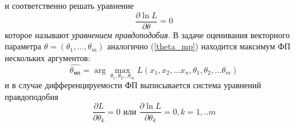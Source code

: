 \documentclass[12pt,a4paper]{scrartcl}
\begin{document}
    и соответственно решать уравнение
    \begin{equation}
         \frac{\partial \ln L}{\partial \theta}= 0
         \label{log_m=0}
    \end{equation}
    которое называют \textit{уравнением правдоподобия}.
    В задаче оценивания векторного параметра $\theta = (\theta_{1}, ... ,\theta_{m})$ аналогично (\ref{theta_mp}) находится максимум ФП нескольких аргументов: 
    \begin{equation}
        \hat{\theta_{мп}} = \arg \max_{\theta_{1}, \theta_{2}...\theta_{m}} L(x_{1}, x_{2},...x_{n}, \theta_{1}, \theta_{2},...\theta_{m})
        \label{multi_theta}
    \end{equation}
    и в случае дифференцируемости ФП выписывается система уравнений правдоподобия
    \begin{equation}
        \frac{\partial L}{\partial \theta_{k}} = 0 \text{  или  } \frac{\partial \ln L}{\partial \theta_{k}} = 0, k = 1,..m
    \end{equation}
\end{document}

